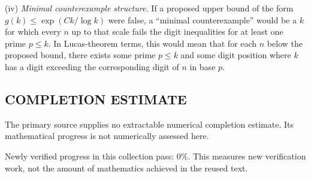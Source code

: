 \smallskip
\noindent
(iv) \emph{Minimal counterexample structure.}
If a proposed upper bound of the form $g(k)\le \exp(Ck/\log k)$ were false, a ``minimal counterexample'' would be a $k$ for which every $n$ up to that scale fails the digit inequalities for at least one prime $p\le k$. In Lucas-theorem terms, this would mean that for each $n$ below the proposed bound, there exists some prime $p\le k$ and some digit position where $k$ has a digit exceeding the corresponding digit of $n$ in base $p$.



\subsection*{COMPLETION ESTIMATE}
The primary source supplies no extractable numerical completion estimate. Its mathematical progress is not numerically assessed here.

Newly verified progress in this collection pass: $0\%$. This measures new verification work, not the amount of mathematics achieved in the reused text.
